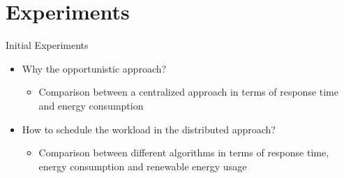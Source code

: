 \documentclass[Ligatures=TeX,table,svgnames,usetotalslideindicator,compress,10pt,aspectratio=169]{beamer}
\begin{document}
\section{Experiments}

\begin{frame}{Initial Experiments}

\begin{itemize}
    \item Why the opportunistic approach? 
    \begin{itemize}
    \item Comparison between a centralized approach in terms of response time and energy consumption    
    \end{itemize}    
    \item How to schedule the workload in the distributed approach?
    \begin{itemize}
    \item Comparison between different algorithms in terms of response time, energy consumption and renewable energy usage   
    \end{itemize}    
\end{itemize}

\end{frame}
\end{document}
